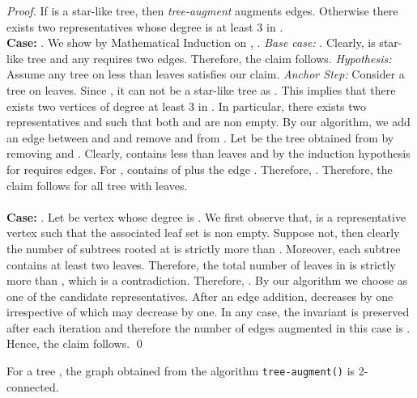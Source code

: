 \documentclass[runningheads]{llncs}
\begin{document}
\begin{proof}
If  is a star-like tree, then {\em tree-augment} augments  edges.  Otherwise there exists two representatives whose degree is at least 3 in . \\
{\bf Case: }.  We show by Mathematical Induction on , .  {\em Base case:} .  Clearly,  is star-like tree and any  requires two edges.  Therefore, the claim  follows. {\em Hypothesis:} Assume any tree on less than  leaves satisfies our claim. {\em Anchor Step:} Consider a tree on  leaves.  Since , it can not be a star-like tree as .  This implies that there exists two vertices of degree at least 3 in .  In particular, there exists two representatives  and  such that both  and  are non empty.  By our algorithm, we add an edge between  and  and remove  and  from .  Let  be the tree obtained from  by removing  and .  Clearly,  contains less than  leaves and by the induction hypothesis  for  requires  edges.  For ,  contains  of  plus the edge .  Therefore, .  Therefore, the claim follows for all tree with  leaves. \\ \\
{\bf Case: }.  Let  be vertex whose degree is .  We first observe that,  is a representative vertex such that the associated leaf set  is non empty.  Suppose not, then clearly the number of subtrees rooted at  is strictly more than .  Moreover, each subtree contains at least two leaves.  Therefore, the total number of leaves in  is  strictly more than , which is a contradiction.  Therefore, .  By our algorithm we choose  as one of the candidate representatives.  After an edge addition,   decreases by one irrespective of  which may decrease by one.  In any case, the invariant   is preserved after each iteration and therefore the number of edges augmented in this case is  .  Hence, the claim follows. \qed
\end{proof}
\begin{theorem}
For a tree , the graph obtained from the algorithm {\tt tree-augment()} is 2-connected.
\end{theorem}
\end{document}
